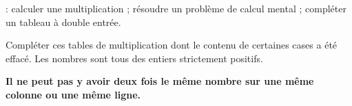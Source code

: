 \begin{changemargin}{-10mm}{-15mm}
\begin{activite}    
    \hspace*{-10mm}{\bf Objectifs} : calculer une multiplication ; résoudre un problème de calcul mental ; compléter un tableau à double entrée.

    Compléter ces tables de multiplication dont le contenu de certaines cases a été effacé. Les nombres sont tous des entiers 
    strictement positifs.
    
    \textbf{Il ne peut pas y avoir deux fois le même nombre sur une même colonne ou une même ligne.}
    {\renewcommand{\arraystretch}{1.7}
       \hfill
       \hfill
       \hfill
       \hfill
       \hspace*{1cm} \\
          
}
\end{activite}
\end{changemargin}
